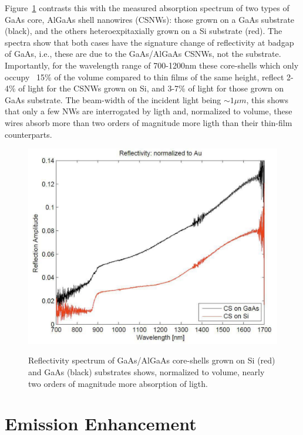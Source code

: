 Figure~\ref{reflectCSNW} contrasts this with the measured absorption spectrum
of two types of GaAs core, AlGaAs shell nanowires (CSNWs): those grown on a
GaAs substrate (black), and the others heteroexpitaxially grown on a Si
substrate (red). The spectra show that both cases have the signature change of
reflectivity at badgap of GaAs, i.e., these are due to the GaAs/AlGaAs CSNWs,
not the substrate. Importantly, for the wavelength range of 700-1200nm these
core-shells which only occupy ~15\% of the volume compared to thin films of the
same height, reflect 2-4\% of light for the CSNWs grown on Si, and 3-7\% of
light for those grown on GaAs substrate. The beam-width of the incident light
being $\sim1{\mu}m$, this shows that only a few NWs are interrogated by ligth
and, normalized to volume, these wires absorb more than two orders of magnitude
more ligth than their thin-film counterparts.

\begin{figure}
  \caption{Reflectivity spectrum of GaAs/AlGaAs core-shells grown on Si (red) and GaAs (black) substrates shows, normalized to volume, nearly two orders of magnitude more absorption of ligth.}
  \centering
  \includegraphics[width=\textwidth]{pictures/Data/reflectCSNW}
  \label{reflectCSNW}
\end{figure}

\section{Emission Enhancement} \label{Dust_data}

